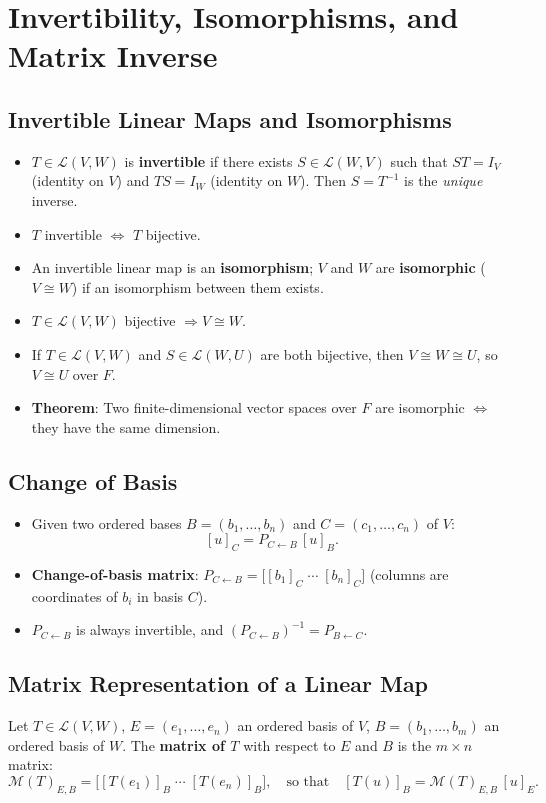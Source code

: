 \documentclass[hidelinks]{article}
\begin{document}
\section{Invertibility, Isomorphisms, and Matrix Inverse}

\subsection{Invertible Linear Maps and Isomorphisms}
\begin{itemize}
    \item $T\in\mathcal{L}(V,W)$ is \textbf{invertible} if there exists $S\in\mathcal{L}(W,V)$ such that $ST = I_V$ (identity on $V$) and $TS = I_W$ (identity on $W$). Then $S = T^{-1}$ is the \emph{unique} inverse.
    \item $T$ invertible $\iff$ $T$ bijective.
    \item An invertible linear map is an \textbf{isomorphism}; $V$ and $W$ are \textbf{isomorphic} ($V \cong W$) if an isomorphism between them exists.
    \item $T\in\mathcal{L}(V,W)$ bijective $\Rightarrow V\cong W$.
    \item If $T\in\mathcal{L}(V,W)$ and $S\in\mathcal{L}(W,U)$ are both bijective, then $V\cong W\cong U$, so $V\cong U$ over $F$.
    \item \textbf{Theorem}: Two finite-dimensional vector spaces over $F$ are isomorphic $\iff$ they have the same dimension.
\end{itemize}

\subsection{Change of Basis}
\begin{itemize}
    \item Given two ordered bases $B=(b_1,\ldots,b_n)$ and $C=(c_1,\ldots,c_n)$ of $V$:
    \[
        [u]_C = P_{C\leftarrow B}\,[u]_B.
    \]
    \item \textbf{Change-of-basis matrix}: $P_{C\leftarrow B} = \bigl[[b_1]_C \;\cdots\; [b_n]_C\bigr]$ (columns are coordinates of $b_i$ in basis $C$).
    \item $P_{C\leftarrow B}$ is always invertible, and $(P_{C\leftarrow B})^{-1} = P_{B\leftarrow C}$.
\end{itemize}

\subsection{Matrix Representation of a Linear Map}
Let $T\in\mathcal{L}(V,W)$, $E=(e_1,\ldots,e_n)$ an ordered basis of $V$, $B=(b_1,\ldots,b_m)$ an ordered basis of $W$. The \textbf{matrix of $T$} with respect to $E$ and $B$ is the $m\times n$ matrix:
\[
    \mathcal{M}(T)_{E,B} = \bigl[[T(e_1)]_B \;\cdots\; [T(e_n)]_B\bigr],
    \quad \text{so that} \quad
    [T(u)]_B = \mathcal{M}(T)_{E,B}\,[u]_E.
\]
\end{document}
